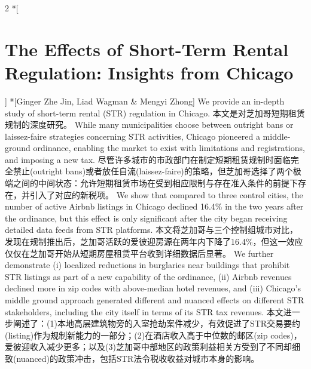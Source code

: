 \documentclass[cn,hazy,blue,14pt,screen]{elegantnote}
\begin{document}
\begin{paracol}{2}
	\switchcolumn[0]*[\section{The Effects of Short-Term Rental Regulation: Insights from Chicago}]
	\switchcolumn[0]*[Ginger Zhe Jin, Liad Wagman \& Mengyi Zhong]
	\switchcolumn
	\switchcolumn
	We provide an in-depth study of short-term rental (STR) regulation in Chicago. 
	\switchcolumn
	本文是对芝加哥短期租赁规制的深度研究。
	\switchcolumn*
	While many municipalities choose between outright bans or laissez-faire strategies concerning STR activities, Chicago pioneered a middle-ground ordinance, enabling the market to exist with limitations and registrations, and imposing a new tax. 
	\switchcolumn
	尽管许多城市的市政部门在制定短期租赁规制时面临完全禁止(outright bans)或者放任自流(laissez-faire)的策略，但芝加哥选择了两个极端之间的中间状态：允许短期租赁市场在受到相应限制与存在准入条件的前提下存在，并引入了对应的新税项。
	\switchcolumn*
	We show that compared to three control cities, the number of active Airbnb listings in Chicago declined 16.4\% in the two years after the ordinance, but this effect is only significant after the city began receiving detailed data feeds from STR platforms. 
	\switchcolumn
	本文将芝加哥与三个控制组城市对比，发现在规制推出后，芝加哥活跃的爱彼迎房源在两年内下降了16.4\%，但这一效应仅仅在芝加哥开始从短期房屋租赁平台收到详细数据后显著。
	\switchcolumn*
	We further demonstrate (i) localized reductions in burglaries near buildings that prohibit STR listings as part of a new capability of the ordinance, (ii) Airbnb revenues declined more in zip codes with above-median hotel revenues, and (iii) Chicago's middle ground approach generated different and nuanced effects on different STR stakeholders, including the city itself in terms of its STR tax revenues.
	\switchcolumn
	本文进一步阐述了：(1)本地高层建筑物旁的入室抢劫案件减少，有效促进了STR交易要约(listing)作为规制新能力的一部分；(2)在酒店收入高于中位数的邮区(zip codes)，爱彼迎收入减少更多；以及(3)芝加哥中部地区的政策利益相关方受到了不同却细致(nuanced)的政策冲击，包括STR法令税收收益对城市本身的影响。
\end{paracol}
\end{document}
